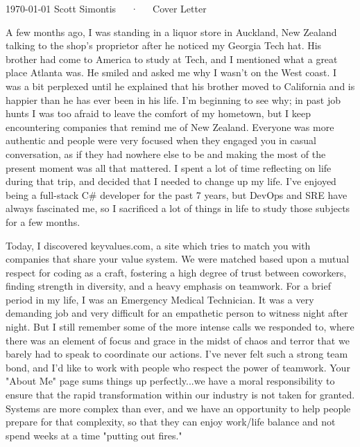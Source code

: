\documentclass[11pt, letterpaper]{awesome-cv}
\begin{document}
\makecvheader[R]

\makecvfooter
  {\today}
  {Scott Simontis~~~·~~~Cover Letter}
  {}

\makelettertitle

\begin{cvletter}

A few months ago, I was standing in a liquor store in Auckland, New Zealand talking to the shop's proprietor after he noticed my Georgia Tech hat. His brother had come to America to study at Tech, and I mentioned what a great place Atlanta was. He smiled and asked me why I wasn't on the West coast. I was a bit perplexed until he explained that his brother moved to California and is happier than he has ever been in his life. I'm beginning to see why; in past job hunts I was too afraid to leave the comfort of my hometown, but I keep encountering companies that remind me of New Zealand. Everyone was more authentic and people were very focused when they engaged you in casual conversation, as if they had nowhere else to be and making the most of the present moment was all that mattered. I spent a lot of time reflecting on life during that trip, and decided that I needed to change up my life. I've enjoyed being a full-stack C\# developer for the past 7 years, but DevOps and SRE have always fascinated me, so I sacrificed a lot of things in life to study those subjects for a few months.

Today, I discovered keyvalues.com, a site which tries to match you with companies that share your value system. We were matched based upon a mutual respect for coding as a craft, fostering a high degree of trust between coworkers, finding strength in diversity, and a heavy emphasis on teamwork. For a brief period in my life, I was an Emergency Medical Technician. It was a very demanding job and very difficult for an empathetic person to witness night after night. But I still remember some of the more intense calls we responded to, where there was an element of focus and grace in the midst of chaos and terror that we barely had to speak to coordinate our actions. I've never felt such a strong team bond, and I'd like to work with people who respect the power of teamwork. Your "About Me" page sums things up perfectly...we have a moral responsibility to ensure that the rapid transformation within our industry is not taken for granted. Systems are more complex than ever, and we have an opportunity to help people prepare for that complexity, so that they can enjoy work/life balance and not spend weeks at a time "putting out fires."


\end{cvletter}
\end{document}
